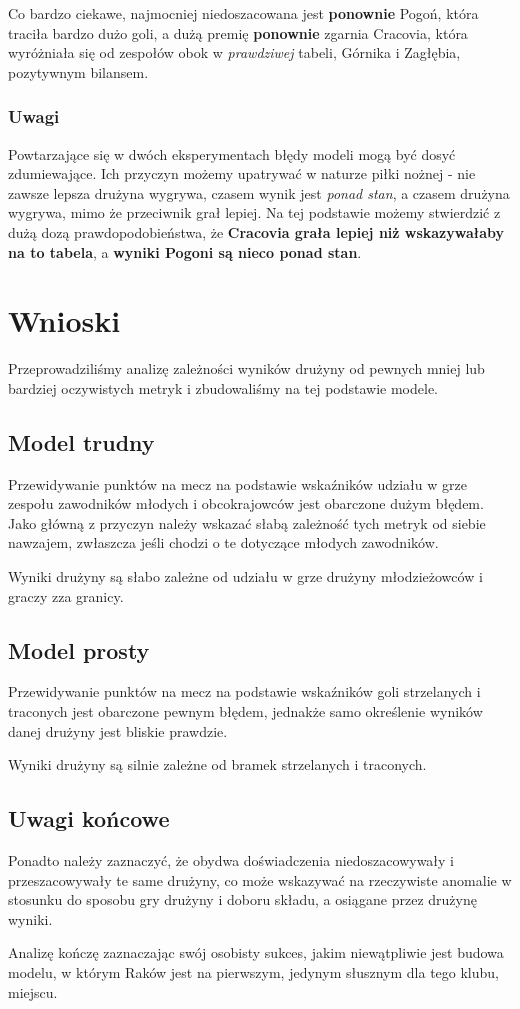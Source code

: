 \documentclass{article}
\begin{document}
Co bardzo ciekawe, najmocniej niedoszacowana jest \textbf{ponownie} Pogoń, która traciła bardzo dużo goli, a dużą premię \textbf{ponownie} zgarnia Cracovia, która wyróżniała się od zespołów obok w \textit{prawdziwej} tabeli, Górnika i Zagłębia, pozytywnym bilansem.

\subsubsection{Uwagi}

Powtarzające się w dwóch eksperymentach błędy modeli mogą być dosyć zdumiewające. Ich przyczyn możemy upatrywać w naturze piłki nożnej - nie zawsze lepsza drużyna wygrywa, czasem wynik jest \textit{ponad stan}, a czasem drużyna wygrywa, mimo że przeciwnik grał lepiej. Na tej podstawie możemy stwierdzić z dużą dozą prawdopodobieństwa, że \textbf{Cracovia grała lepiej niż wskazywałaby na to tabela}, a \textbf{wyniki Pogoni są nieco ponad stan}.

\section{Wnioski}

Przeprowadziliśmy analizę zależności wyników drużyny od pewnych mniej lub bardziej oczywistych metryk i zbudowaliśmy na tej podstawie modele.

\subsection{Model trudny}

Przewidywanie punktów na mecz na podstawie wskaźników udziału w grze zespołu zawodników młodych i obcokrajowców jest obarczone dużym błędem. Jako główną z przyczyn należy wskazać słabą zależność tych metryk od siebie nawzajem, zwłaszcza jeśli chodzi o te dotyczące młodych zawodników.

Wyniki drużyny są słabo zależne od udziału w grze drużyny młodzieżowców i graczy zza granicy.

\subsection{Model prosty}

Przewidywanie punktów na mecz na podstawie wskaźników goli strzelanych i traconych jest obarczone pewnym błędem, jednakże samo określenie wyników danej drużyny jest bliskie prawdzie.

Wyniki drużyny są silnie zależne od bramek strzelanych i traconych.

\subsection{Uwagi końcowe}

Ponadto należy zaznaczyć, że obydwa doświadczenia niedoszacowywały i przeszacowywały te same drużyny, co może wskazywać na rzeczywiste anomalie w stosunku do sposobu gry drużyny i doboru składu, a osiągane przez drużynę wyniki.

Analizę kończę zaznaczając swój osobisty sukces, jakim niewątpliwie jest budowa modelu, w którym Raków jest na pierwszym, jedynym słusznym dla tego klubu, miejscu.


\end{document}
